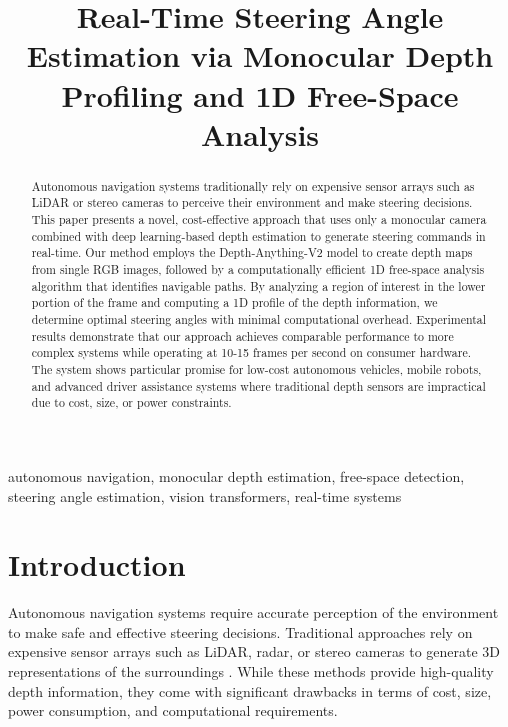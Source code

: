 \documentclass[conference]{IEEEtran}
\begin{document}
\title{Real-Time Steering Angle Estimation via Monocular Depth Profiling and 1D Free-Space Analysis}

\author{
}

\maketitle

\begin{abstract}
Autonomous navigation systems traditionally rely on expensive sensor arrays such as LiDAR or stereo cameras to perceive their environment and make steering decisions. This paper presents a novel, cost-effective approach that uses only a monocular camera combined with deep learning-based depth estimation to generate steering commands in real-time. Our method employs the Depth-Anything-V2 model to create depth maps from single RGB images, followed by a computationally efficient 1D free-space analysis algorithm that identifies navigable paths. By analyzing a region of interest in the lower portion of the frame and computing a 1D profile of the depth information, we determine optimal steering angles with minimal computational overhead. Experimental results demonstrate that our approach achieves comparable performance to more complex systems while operating at 10-15 frames per second on consumer hardware. The system shows particular promise for low-cost autonomous vehicles, mobile robots, and advanced driver assistance systems where traditional depth sensors are impractical due to cost, size, or power constraints.
\end{abstract}

\begin{IEEEkeywords}
autonomous navigation, monocular depth estimation, free-space detection, steering angle estimation, vision transformers, real-time systems
\end{IEEEkeywords}

\section{Introduction}
Autonomous navigation systems require accurate perception of the environment to make safe and effective steering decisions. Traditional approaches rely on expensive sensor arrays such as LiDAR, radar, or stereo cameras to generate 3D representations of the surroundings \cite{b1}. While these methods provide high-quality depth information, they come with significant drawbacks in terms of cost, size, power consumption, and computational requirements.
\end{document}

